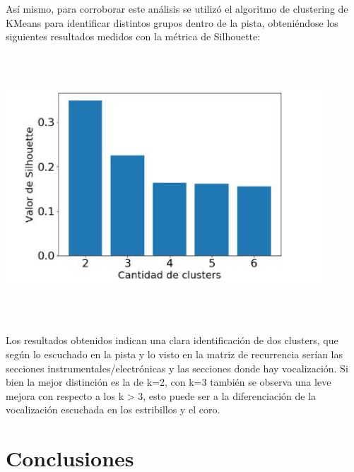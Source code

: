 \documentclass{icisfinal}
\begin{document}
Así mismo, para corroborar este análisis se utilizó el algoritmo de clustering de KMeans para identificar distintos grupos dentro de la pista, obteniéndose los siguientes resultados medidos con la métrica de Silhouette:

\includegraphics[width=12cm, height=10cm]{img/imagenes/11cantidad_clusters}

Los resultados obtenidos indican una clara identificación de dos clusters, que según lo escuchado en la pista y lo visto en la matriz de recurrencia serían las secciones instrumentales/electrónicas y las secciones donde hay vocalización. Si bien la mejor distinción es la de k=2, con k=3 también se observa una leve mejora con respecto a los k > 3, esto puede ser a la diferenciación de la vocalización escuchada en los estribillos y el coro.

\newpage
\section{Conclusiones}


\printbibliography
\end{document}
